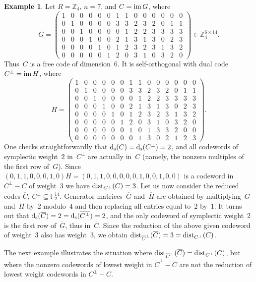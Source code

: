 \documentclass[11pt]{article}
\theoremstyle{definition}
\newtheorem{exa}[theo]{Example}
\numberwithin{equation}{section}
\newcommand{\F}{{\mathbb F}}
\newcommand{\Z}{{\mathbb Z}}
\newcommand{\im}{\mbox{\rm im}\,}
\newcommand{\ds}{\mbox{${\rm d}_{\rm s}$}}
\newcommand{\ov}[1]{\mbox{$\overline{#1}$}}
\newcommand{\dist}{\textup{dist}}
\begin{document}
\begin{exa}\label{E-FreeCodeNonPure}
Let $R=\Z_4,\,n=7$, and $C=\im G$, where
\[
  G=\left(\!\!\begin{array}{ccccccc|ccccccc}1&0&0&0&0&0&1&1&0&0&0&0&0&0\\0&1&0&0&0&0&3&3&2&3&2&0&1&1\\0&0&1&0&0&0&0&1&2&2&3&3&3&3\\
   0&0&0&1&0&0&2&1&3&1&3&0&2&3\\0&0&0&0&1&0&1&2&3&2&3&1&3&2\\0&0&0&0&0&1&2&0&3&1&0&3&2&0\end{array}\!\!\right)\in\Z_4^{6\times 14}.
\]
Thus~$C$ is a free code of dimension~$6$. It is self-orthogonal with dual code $C^\perp=\im H$, where
\[
  H=\left(\!\!\begin{array}{ccccccc|ccccccc}1&0&0&0&0&0&1&1&0&0&0&0&0&0\\0&1&0&0&0&0&3&3&2&3&2&0&1&1\\0&0&1&0&0&0&0&1&2&2&3&3&3&3\\
   0&0&0&1&0&0&2&1&3&1&3&0&2&3\\0&0&0&0&1&0&1&2&3&2&3&1&3&2\\0&0&0&0&0&1&2&0&3&1&0&3&2&0\\0&0&0&0&0&0&1&0&1&3&3&2&0&0\\
   0&0&0&0&0&0&0&1&3&0&2&1&2&3\end{array}\!\!\right).
\]
One checks straightforwardly that $\ds(C)=\ds(C^{\perp})=2$,
and all codewords of symplectic weight~$2$ in~$C^{\perp}$ are actually in~$C$ (namely, the nonzero multiples of the first row of~$G$).
Since $(0,1,1,0,0,0,1,0)H=(0, 1, 1, 0, 0, 0, 0, 0, 1, 0, 0, 1, 0, 0)$ is a codeword in~$C^\perp-C$ of weight~$3$ we have $\dist_{C^\perp}(C)=3$.
Let us now consider the reduced codes $\ov{C},\,\ov{C^\perp}\subseteq\F_2^{14}$.
Generator matrices~$\ov{G}$ and~$\ov{H}$ are obtained by multiplying~$G$ and~$H$ by~$2$ modulo~$4$ and then replacing all entries equal to~$2$ by~$1$.
It turns out that $\ds(\ov{C})=2=\ds(\ov{C^\perp})=2$, and the only codeword of symplectic weight~$2$ is the first row of~$\ov{G}$, thus in~$\ov{C}$.
Since the reduction of the above given codeword of weight~$3$ also has weight~$3$, we obtain
$\dist_{\small{\overline{C}^\perp}}(\ov{C})=3=\dist_{C^\perp}(C)$.
\end{exa}

The next example illustrates the situation where $\dist_{\small{\overline{C}^\perp}}(\ov{C})=\dist_{C^\perp}(C)$, but where the nonzero codewords of lowest weight
in $\ov{C}^\perp-\ov{C}$ are not the reduction of lowest weight codewords in $C^\perp-C$.
\end{document}
